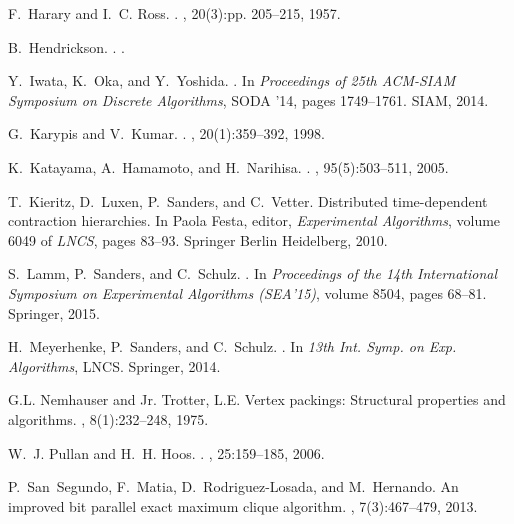 \documentclass[11pt]{article}
\begin{document}
\begin{thebibliography}{10}
F.~Harary and I.~C. Ross.
.
, 20(3):pp. 205--215, 1957.

B.~Hendrickson.
.
.

Y.~Iwata, K.~Oka, and Y.~Yoshida.
.
\newblock In {\em Proceedings of 25th ACM-SIAM Symposium on Discrete
  Algorithms}, SODA '14, pages 1749--1761. SIAM, 2014.

G.~Karypis and V.~Kumar.
.
, 20(1):359--392, 1998.

K.~Katayama, A.~Hamamoto, and H.~Narihisa.
.
, 95(5):503--511, 2005.

T.~Kieritz, D.~Luxen, P.~Sanders, and C.~Vetter.
\newblock Distributed time-dependent contraction hierarchies.
\newblock In Paola Festa, editor, {\em Experimental Algorithms}, volume 6049 of
  {\em LNCS}, pages 83--93. Springer Berlin Heidelberg, 2010.

S.~Lamm, P.~Sanders, and C.~Schulz.
.
\newblock In {\em Proceedings of the 14th International Symposium on
  Experimental Algorithms (SEA'15)}, volume 8504, pages 68--81. Springer, 2015.

H.~Meyerhenke, P.~Sanders, and C.~Schulz.
.
\newblock In {\em 13th Int. Symp. on Exp. Algorithms}, LNCS. Springer, 2014.

G.L. Nemhauser and Jr. Trotter, L.E.
\newblock Vertex packings: Structural properties and algorithms.
, 8(1):232--248, 1975.

W.~J. Pullan and H.~H. Hoos.
.
, 25:159--185,
  2006.

P.~San~Segundo, F.~Matia, D.~Rodriguez-Losada, and M.~Hernando.
\newblock An improved bit parallel exact maximum clique algorithm.
, 7(3):467--479, 2013.


\end{thebibliography}
\end{document}
